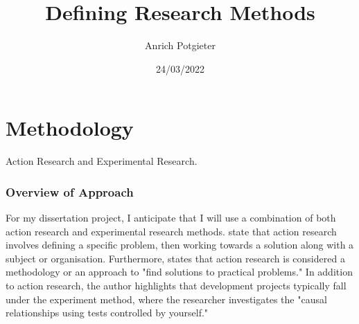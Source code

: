 \documentclass[12pt]{article}
\title{Defining Research Methods}
\author{Anrich Potgieter}
\date{24/03/2022}
\begin{document}
\maketitle
\tableofcontents

\section{Methodology}

Action Research and Experimental Research.

\subsubsection{Overview of Approach}

For my dissertation project, I anticipate that I will use a combination of both action research and experimental research methods.
\autocite{dawsonChapterResearchMethods2015} state that action research involves defining a specific problem, then working towards a solution along with a subject or organisation.
Furthermore, \autocite{blairChapterChoosingMethodology2016} states that action research is considered a methodology or an approach to "find solutions to practical problems."
In addition to action research, the author highlights that development projects typically fall under the experiment method, where the researcher investigates the "causal relationships using tests controlled by yourself."


\printbibliography
\end{document}

